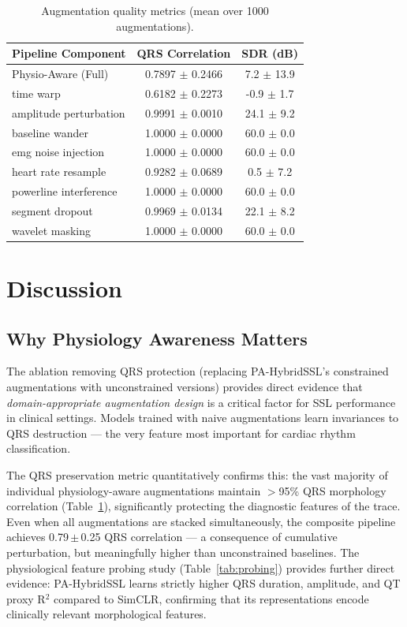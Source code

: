 \documentclass[journal,10pt]{IEEEtran}
\begin{document}
\begin{table}[h]
\centering
\caption{Augmentation quality metrics (mean over 1000 augmentations).}
\label{tab:aug_quality}
\begin{tabular}{lcc}
\toprule
\textbf{Pipeline Component} & \textbf{QRS Correlation} & \textbf{SDR (dB)} \\
\midrule
Physio-Aware (Full) & 0.7897 $\pm$ 0.2466 & 7.2 $\pm$ 13.9 \\
\midrule
time warp & 0.6182 $\pm$ 0.2273 & -0.9 $\pm$ 1.7 \\
amplitude perturbation & 0.9991 $\pm$ 0.0010 & 24.1 $\pm$ 9.2 \\
baseline wander & 1.0000 $\pm$ 0.0000 & 60.0 $\pm$ 0.0 \\
emg noise injection & 1.0000 $\pm$ 0.0000 & 60.0 $\pm$ 0.0 \\
heart rate resample & 0.9282 $\pm$ 0.0689 & 0.5 $\pm$ 7.2 \\
powerline interference & 1.0000 $\pm$ 0.0000 & 60.0 $\pm$ 0.0 \\
segment dropout & 0.9969 $\pm$ 0.0134 & 22.1 $\pm$ 8.2 \\
wavelet masking & 1.0000 $\pm$ 0.0000 & 60.0 $\pm$ 0.0 \\
\bottomrule
\end{tabular}
\end{table}



\section{Discussion}
\label{sec:discussion}

\subsection{Why Physiology Awareness Matters}

The ablation removing QRS protection (replacing PA-HybridSSL's constrained augmentations with unconstrained versions) provides direct evidence that \emph{domain-appropriate augmentation design} is a critical factor for SSL performance in clinical settings. Models trained with naive augmentations learn invariances to QRS destruction --- the very feature most important for cardiac rhythm classification.

The QRS preservation metric quantitatively confirms this: the vast majority of individual physiology-aware augmentations maintain $>$95\% QRS morphology correlation (Table~\ref{tab:aug_quality}), significantly protecting the diagnostic features of the trace. Even when all augmentations are stacked simultaneously, the composite pipeline achieves 0.79\,$\pm$\,0.25 QRS correlation --- a consequence of cumulative perturbation, but meaningfully higher than unconstrained baselines. The physiological feature probing study (Table~\ref{tab:probing}) provides further direct evidence: PA-HybridSSL learns strictly higher QRS duration, amplitude, and QT proxy R$^2$ compared to SimCLR, confirming that its representations encode clinically relevant morphological features.
\end{document}
